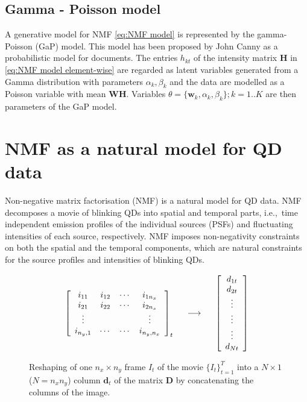 \subsection{Gamma - Poisson model \label{sub:GaP}}
A generative model for NMF \autoref{eq:NMF model} is represented by the gamma-Poisson (GaP) model. This model has been proposed by John Canny \cite{Canny2004} as a probabilistic model for documents. The entries $h_{kt}$ of the intensity matrix $\bm{H}$ in \autoref{eq:NMF model element-wise} are regarded as latent variables generated from a Gamma distribution with parameters $\alpha_k, \beta_k$ and the data are modelled as a Poisson variable with mean $\bm{WH}$. Variables $\theta = \{\bm{w}_k,\alpha_k, \beta_k\}; k = 1..K$ are then parameters of the GaP model.
\afterpage{\clearpage}

\section{NMF as a natural model for QD data\label{sec: NMF QD}}
Non-negative matrix factorisation (NMF) \cite{Lee1999,Lee2001} is a natural model for QD data. NMF decomposes a movie of blinking QDs into spatial and temporal parts, i.e.,\ time independent emission profiles of the individual sources (PSFs) and fluctuating intensities of each source, respectively. NMF imposes non-negativity constraints on both the spatial and the temporal components, which are natural constraints for the source profiles and intensities of blinking QDs.

\begin{figure}[!tb]
	\begin{equation}
		\left[
		\begin{array}{ccccc}
		i_{11} & i_{12}  & \cdots & i_{1n_x}\\
		i_{21} & i_{22}  & \cdots & i_{2n_x}\\
		\vdots & & & \vdots\\
		i_{n_y,1} & \cdots & \cdots & i_{n_y,n_x}
		\end{array}	
		\right]_t
		\hspace{.5cm}
		\longrightarrow
		\hspace{.5cm}
		\left[
		\begin{array}{c}	
		d_{1t}\\	d_{2t}\\	\vdots\\ \vdots\\ \vdots\\ d_{Nt}
		\end{array}
		\right]\nonumber
	\end{equation}
	\caption{Reshaping of one $n_x \times n_y$ frame $I_t$ of the movie $\{I_t\}_{t=1}^T$ into a $N\times 1$ ($N=n_x n_y$) column $\bm{d}_t$ of the matrix $\bm{D}$ by concatenating the columns of the image.}
	\label{fig:reshape image}
\end{figure}

